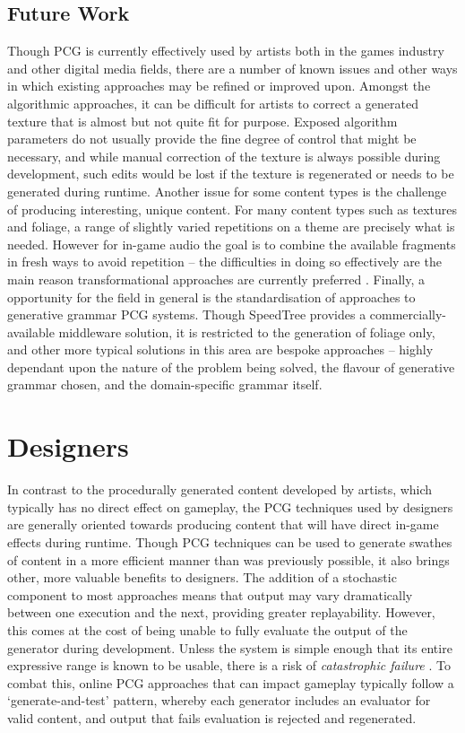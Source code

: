 \documentclass{acm_proc_article-sp}
\begin{document}
\subsection{Future Work}
Though PCG is currently effectively used by artists both in the games industry and other digital media fields, there are a number of known issues and other ways in which existing approaches may be refined or improved upon. Amongst the algorithmic approaches, it can be difficult for artists to correct a generated texture that is almost but not quite fit for purpose. Exposed algorithm parameters do not usually provide the fine degree of control that might be necessary, and while manual correction of the texture is always possible during development, such edits would be lost if the texture is regenerated or needs to be generated during runtime.
Another issue for some content types is the challenge of producing interesting, unique content. For many content types such as textures and foliage, a range of slightly varied repetitions on a theme are precisely what is needed. However for in-game audio the goal is to combine the available fragments in fresh ways to avoid repetition -- the difficulties in doing so effectively are the main reason transformational approaches are currently preferred \cite{collins2009introduction}.
Finally, a opportunity for the field in general is the standardisation of approaches to generative grammar PCG systems. Though SpeedTree provides a commercially-available middleware solution, it is restricted to the generation of foliage only, and other more typical solutions in this area are bespoke approaches -- highly dependant upon the nature of the problem being solved, the flavour of generative grammar chosen, and the domain-specific grammar itself.



\section{Designers}
In contrast to the procedurally generated content developed by artists, which typically has no direct effect on gameplay, the PCG techniques used by designers are generally oriented towards producing content that will have direct in-game effects during runtime. Though PCG techniques can be used to generate swathes of content in a more efficient manner than was previously possible, it also brings other, more valuable benefits to designers. The addition of a stochastic component to most approaches means that output may vary dramatically between one execution and the next, providing greater replayability. However, this comes at the cost of being unable to fully evaluate the output of the generator during development. Unless the system is simple enough that its entire expressive range is known to be usable, there is a risk of \textit{catastrophic failure} \cite{togelius2011search}. To combat this, online PCG approaches that can impact gameplay typically follow a `generate-and-test' pattern, whereby each generator includes an evaluator for valid content, and output that fails evaluation is rejected and regenerated.
\end{document}
